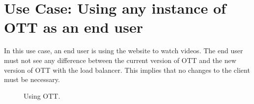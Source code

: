 \section{Use Case: Using any instance of OTT as an end user}

In this use case, an end user is using the website to watch videos. The end user must not see any difference between the current version of OTT and the new version of OTT with the load balancer. This implies that no changes to the client must be necessary.

\begin{figure}[!htb]
  \centering
  \caption{\label{Figure::enduser-usecase} Using OTT.}
\end{figure}